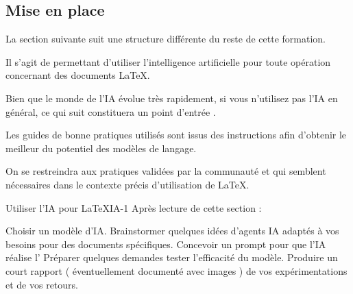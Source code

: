 \subsection{Mise en place}

La section suivante suit une structure différente du reste de cette formation. 

Il s'agit de  permettant d'utiliser l'intelligence artificielle pour toute opération concernant des documents LaTeX. 

\bcattention Bien que le monde de l'IA évolue très rapidement, si vous n'utilisez pas l'IA en général, ce qui suit constituera un point d'entrée . 

Les guides de bonne pratiques utilisés sont issus des instructions  afin d'obtenir le meilleur du potentiel des modèles de langage.

On se restreindra aux pratiques validées par la communauté et qui semblent nécessaires dans le contexte précis d'utilisation de \LaTeX. 

\begin{EXO}{Utiliser l'IA pour LaTeX}{IA-1}
    Après lecture de cette section :
    \begin{tcbenumerate}[2]
        \tcbitem Choisir un modèle d'IA.
        \tcbitem Brainstormer quelques idées d'agents IA adaptés à vos besoins pour des documents spécifiques. 
        \tcbitem Concevoir un prompt  pour que l'IA réalise l'
        \tcbitem Préparer quelques demandes tester l'efficacité du modèle. 
        \tcbitem[raster multicolumn=2] Produire un court rapport ( éventuellement documenté avec images ) de vos expérimentations et de vos retours.
    \end{tcbenumerate}
\end{EXO}